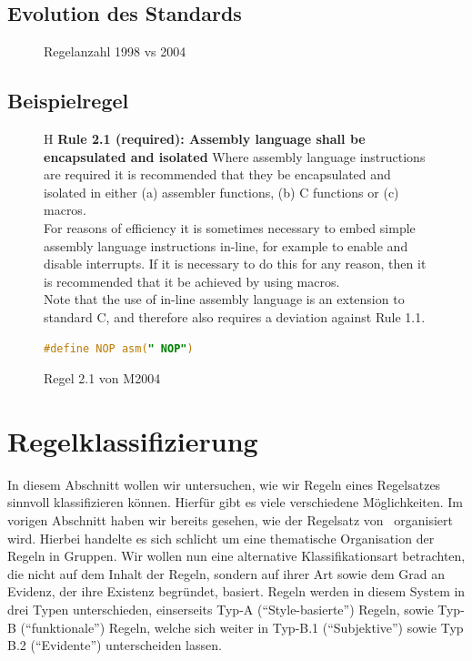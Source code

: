 \documentclass[a4paper,UKenglish,cleveref, autoref]{templates/lipics-v2019}
\begin{document}
    \subsection{Evolution des Standards}
    \label{subsec:evolution-des-standards}

    \begin{figure}[H]
        \centering
        \captionsetup{justification=centering,margin=2cm}
        
        \caption{Regelanzahl 1998 vs 2004}
    \end{figure}

    \subsection{Beispielregel}
    \label{subsec:beispielregel}

    \begin{figure}{H}
        \captionsetup{justification=centering,margin=2cm}
        \textbf{Rule 2.1 (required): Assembly language shall be encapsulated and isolated}
        Where assembly language instructions are required it is recommended that they be encapsulated
        and isolated in either (a) assembler functions, (b) C functions or (c) macros.\\
        For reasons of efficiency it is sometimes necessary to embed simple assembly language instructions
        in-line, for example to enable and disable interrupts.
        If it is necessary to do this for any reason, then it is recommended that it be achieved by using macros.\\
        Note that the use of in-line assembly language is an extension to standard C, and therefore also
        requires a deviation against Rule 1.1.
        \begin{lstlisting}[language=C]
            #define NOP asm(" NOP")
        \end{lstlisting}
        \caption{Regel 2.1 von M2004\cite{MISRA2004}}
    \end{figure}

    \section{Regelklassifizierung}
    \label{sec:regelklassifizierung}
    In diesem Abschnitt wollen wir untersuchen, wie wir Regeln eines Regelsatzes sinnvoll klassifizieren können.
    Hierfür gibt es viele verschiedene Möglichkeiten.
    Im vorigen Abschnitt haben wir bereits gesehen, wie der Regelsatz von \misra\ organisiert wird.
    Hierbei handelte es sich schlicht um eine thematische Organisation der Regeln in Gruppen.
    Wir wollen nun eine alternative Klassifikationsart betrachten, die nicht auf dem Inhalt der Regeln, sondern auf ihrer
    Art sowie dem Grad an Evidenz, der ihre Existenz begründet, basiert.
    Regeln werden in diesem System in drei Typen unterschieden, einserseits Typ-A (\enquote{Style-basierte}) Regeln,
    sowie Typ-B (\enquote{funktionale}) Regeln, welche sich weiter in Typ-B.1 (\enquote{Subjektive}) sowie
    Typ B.2 (\enquote{Evidente}) unterscheiden lassen.\cite{hatton2004safer}
\end{document}
